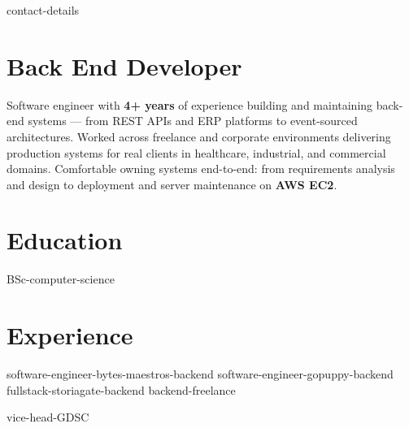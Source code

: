 \documentclass[a4paper,11pt]{article}
\newcommand{\resumeHeadingListStart}{
  \begin{itemize}[leftmargin=0.15in, label={}]
}
\newcommand{\resumeHeadingListEnd}{\end{itemize}}
\begin{document}

{contact-details}



\section{Back End Developer}
\small{
  Software engineer with \textbf{4+ years} of experience building and maintaining back-end systems —
  from REST APIs and ERP platforms to event-sourced architectures. Worked
  across freelance and corporate environments delivering production systems
  for real clients in healthcare, industrial, and commercial domains.
  Comfortable owning systems end-to-end: from requirements analysis and
  design to deployment and server maintenance on \textbf{AWS EC2}.
}


\section{Education}
  \resumeHeadingListStart{}
    {BSc-computer-science}
  \resumeHeadingListEnd{}


\section{Experience}
\resumeHeadingListStart{}
  {software-engineer-bytes-maestros-backend}
  {software-engineer-gopuppy-backend}
  {fullstack-storiagate-backend}
  {backend-freelance}

  {vice-head-GDSC}
\resumeHeadingListEnd{}
\end{document}
